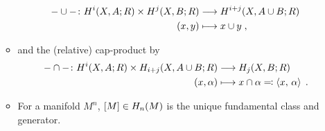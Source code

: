 \begin{itemize}
\begin{itemize}
\begin{align*}
      -\cup-\colon
      H^i(X,A;R)\times H^j(X,B;R) &\longrightarrow H^{i+j}(X,A\cup B;R)\\
      (x, y) &\longmapsto x\cup y\;,
    \end{align*}
  \item and the (relative) cap-product by
    \begin{align*}
      -\cap-\colon
      H^i(X,A;R)\times H_{i+j}(X,A\cup B;R) &\longrightarrow H_j(X,B;R)\\
      (x, \alpha) &\longmapsto x\cap \alpha \eqqcolon \left\langle x,\, \alpha \right\rangle
                    \;.
    \end{align*}
  \item For a manifold $M^n$, $[M]\in H_n(M)$ is the unique
    fundamental class and generator.
  \end{itemize}
\end{itemize}




